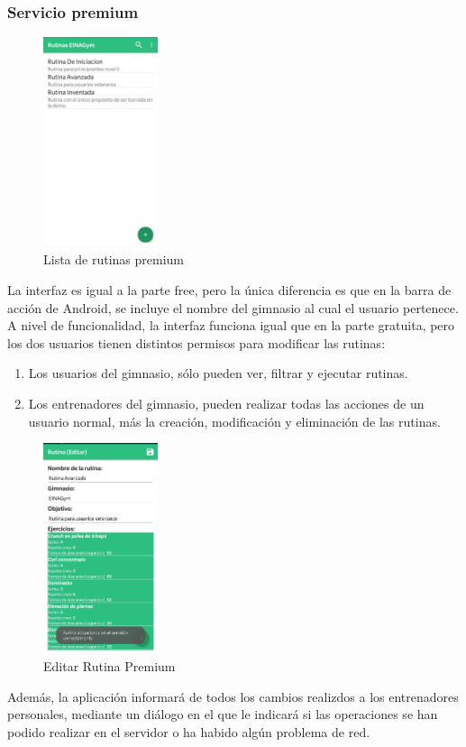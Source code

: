 \documentclass[11pt,a4paper]{report}
\begin{document}
\subsubsection{Servicio premium}
\begin{figure}[H]
	\centering
	\includegraphics[width=0.3\textwidth]{graficos/manual/RutinasPremium.jpg}
	\caption{Lista de rutinas premium}
\end{figure}
La interfaz es igual a la parte free, pero la única diferencia es que en la barra de acción de Android, se incluye el nombre del gimnasio al cual el usuario pertenece.
A nivel de funcionalidad, la interfaz funciona igual que en la parte gratuita, pero los dos usuarios tienen distintos permisos para modificar las rutinas:
\begin{enumerate}
	\item Los usuarios del gimnasio, sólo pueden ver, filtrar y ejecutar rutinas.
	\item Los entrenadores del gimnasio, pueden realizar todas las acciones de un usuario normal, más la creación, modificación y eliminación de las rutinas.
\end{enumerate}
\begin{figure}[H]
	\centering
	\includegraphics[width=0.3\textwidth]{graficos/manual/EditarRutinaPremium.jpg}
	\caption{Editar Rutina Premium}
\end{figure}
Además, la aplicación informará de todos los cambios realizdos a los entrenadores personales, mediante un diálogo en el que le indicará si las operaciones se han podido realizar en el servidor o ha habido algún problema de red.
\end{document}
